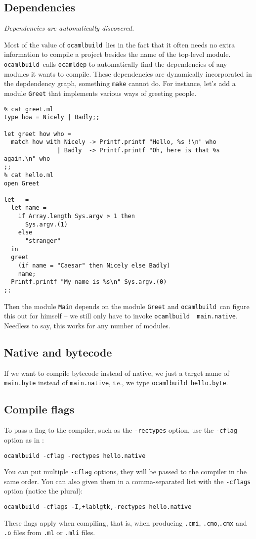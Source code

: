 \documentclass[12pt]{article}
\newcommand{\ocb}{\texttt{ocamlbuild}~}
\begin{document}
\subsection{Dependencies}
{\em Dependencies are automatically discovered.}

Most of the value of \ocb lies in the fact that it often needs no extra
information to compile a project besides the name of the top-level module.
\ocb calls \texttt{ocamldep} to automatically find the dependencies of any
modules it wants to compile.  These dependencies are dynamically incorporated
in the depdendency graph, something \texttt{make} cannot do.
For instance, let's add a module \texttt{Greet} that implements various ways of
greeting people.
\begin{verbatim}
% cat greet.ml
type how = Nicely | Badly;;

let greet how who =
  match how with Nicely -> Printf.printf "Hello, %s !\n" who
               | Badly  -> Printf.printf "Oh, here is that %s again.\n" who
;;
% cat hello.ml
open Greet

let _ =
  let name =
    if Array.length Sys.argv > 1 then
      Sys.argv.(1)
    else
      "stranger"
  in
  greet
    (if name = "Caesar" then Nicely else Badly)
    name;
  Printf.printf "My name is %s\n" Sys.argv.(0)
;;
\end{verbatim}
Then the module \texttt{Main} depends on the module \texttt{Greet} and \ocb can
figure this out for himself -- we still only have to invoke \texttt{\ocb
main.native}.  Needless to say, this works for any number of modules.
\subsection{Native and bytecode}
If we want to compile bytecode instead of native, we just a target name of
\texttt{main.byte} instead of \texttt{main.native}, i.e., we type
\texttt{\ocb hello.byte}.
\subsection{Compile flags}
To pass a flag to the compiler, such as the \texttt{-rectypes} option,
use the \texttt{-cflag} option as in :
\begin{verbatim}
ocamlbuild -cflag -rectypes hello.native
\end{verbatim}
You can put multiple \texttt{-cflag} options, they will be passed to the compiler
in the same order.  You can also given them in a comma-separated list with the
\texttt{-cflags} option (notice the plural):
\begin{verbatim}
ocamlbuild -cflags -I,+lablgtk,-rectypes hello.native
\end{verbatim}
These flags apply when compiling, that is, when producing \texttt{.cmi},
\texttt{.cmo},\texttt{.cmx} and \texttt{.o} files from \texttt{.ml} or
\texttt{.mli} files.
\end{document}
